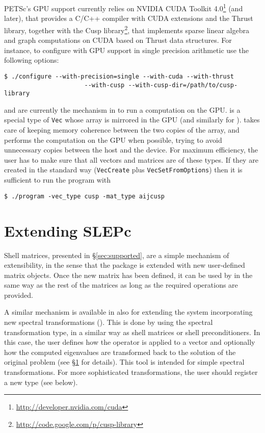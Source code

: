 PETSc's GPU support currently relies on NVIDIA CUDA Toolkit 4.0\footnote{\url{http://developer.nvidia.com/cuda}} (and later), that provides a C/C++ compiler with CUDA extensions and the Thrust library, together with the Cusp library\footnote{\url{http://code.google.com/p/cusp-library}}, that implements sparse linear algebra and graph computations on CUDA based on Thrust data structures. For instance, to configure \petsc with GPU support in single precision arithmetic use the following options:
	\begin{Verbatim}[fontsize=\small]
	$ ./configure --with-precision=single --with-cuda --with-thrust
                      --with-cusp --with-cusp-dir=/path/to/cusp-library
	\end{Verbatim}

 and  are currently the mechanism in \petsc to run a computation on the GPU.  is a special type of \texttt{Vec} whose array is mirrored in the GPU (and similarly for ). \petsc takes care of keeping memory coherence between the two copies of the array, and performs the computation on the GPU when possible, trying to avoid unnecessary copies between the host and the device. For maximum efficiency, the user has to make sure that all vectors and matrices are of these types. If they are created in the standard way (\texttt{VecCreate} plus \texttt{VecSetFromOptions}) then it is sufficient to run the program with
	\begin{Verbatim}[fontsize=\small]
	$ ./program -vec_type cusp -mat_type aijcusp
	\end{Verbatim}

\section{Extending SLEPc}
\label{sec:shell}

	Shell matrices, presented in \S\ref{sec:supported}, are a simple mechanism of extensibility, in the sense that the package is extended with new user-defined matrix objects. Once the new matrix has been defined, it can be used by \slepc in the same way as the rest of the matrices as long as the required operations are provided.

	A similar mechanism is available in \slepc also for extending the system incorporating new spectral transformations (). This is done by using the  spectral transformation type, in a similar way as shell matrices or shell preconditioners. In this case, the user defines how the operator is applied to a vector and optionally how the computed eigenvalues are transformed back to the solution of the original problem (see \S\ref{sec:shell} for details). This tool is intended for simple spectral transformations. For more sophisticated transformations, the user should register a new  type (see below).

